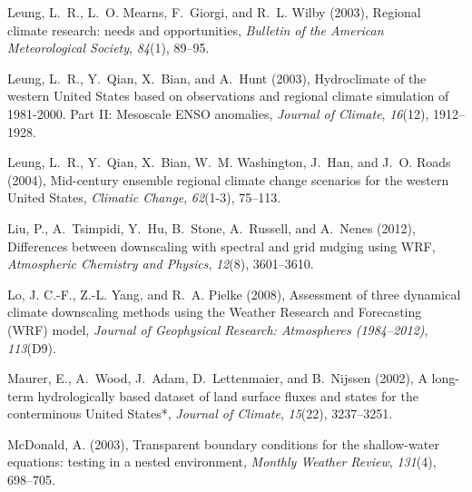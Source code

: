 \documentclass[ms,draft]{agutex}   %
\begin{document}
\begin{article}
\begin{thebibliography}{84}
Leung, L.~R., L.~O. Mearns, F.~Giorgi, and R.~L. Wilby (2003{}),
  Regional climate research: needs and opportunities, \textit{Bulletin of the
  American Meteorological Society}, \textit{84}(1), 89--95.

Leung, L.~R., Y.~Qian, X.~Bian, and A.~Hunt (2003{}), {Hydroclimate
  of the western United States based on observations and regional climate
  simulation of 1981-2000. Part II: Mesoscale ENSO anomalies}, \textit{Journal
  of Climate}, \textit{16}(12), 1912--1928.

Leung, L.~R., Y.~Qian, X.~Bian, W.~M. Washington, J.~Han, and J.~O. Roads
  (2004), {Mid-century ensemble regional climate change scenarios for the
  western United States}, \textit{Climatic Change}, \textit{62}(1-3), 75--113.

Liu, P., A.~Tsimpidi, Y.~Hu, B.~Stone, A.~Russell, and A.~Nenes (2012),
  {Differences between downscaling with spectral and grid nudging using WRF},
  \textit{Atmospheric Chemistry and Physics}, \textit{12}(8), 3601--3610.

Lo, J. C.-F., Z.-L. Yang, and R.~A. Pielke (2008), {Assessment of three
  dynamical climate downscaling methods using the Weather Research and
  Forecasting (WRF) model}, \textit{Journal of Geophysical Research:
  Atmospheres (1984--2012)}, \textit{113}(D9).

Maurer, E., A.~Wood, J.~Adam, D.~Lettenmaier, and B.~Nijssen (2002), {A
  long-term hydrologically based dataset of land surface fluxes and states for
  the conterminous United States*}, \textit{Journal of Climate},
  \textit{15}(22), 3237--3251.

McDonald, A. (2003), Transparent boundary conditions for the shallow-water
  equations: testing in a nested environment, \textit{Monthly Weather Review},
  \textit{131}(4), 698--705.


\end{thebibliography}
\end{article}
\end{document}
